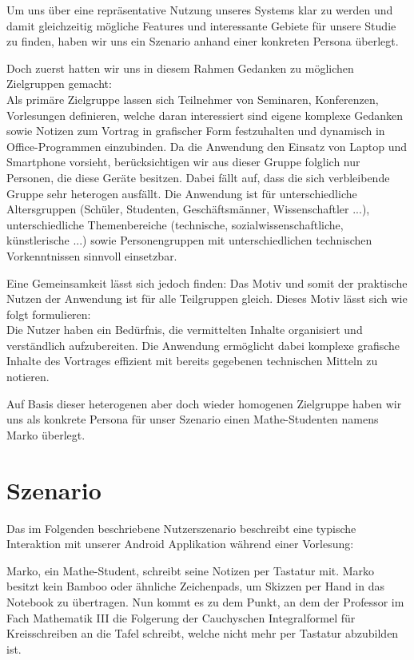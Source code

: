 \documentclass{chi-ext}
\begin{document}
Um uns über eine repräsentative Nutzung unseres Systems klar zu werden und damit gleichzeitig mögliche Features und interessante Gebiete für unsere Studie zu finden, haben wir uns ein Szenario anhand einer konkreten Persona überlegt. 

Doch zuerst hatten wir uns in diesem Rahmen Gedanken zu möglichen Zielgruppen gemacht: \\
Als primäre Zielgruppe lassen sich Teilnehmer von Seminaren, Konferenzen, Vorlesungen definieren, welche daran interessiert sind eigene komplexe Gedanken sowie Notizen zum Vortrag in grafischer Form festzuhalten und dynamisch in Office-Programmen einzubinden.
Da die Anwendung den Einsatz von Laptop und Smartphone vorsieht, berücksichtigen wir aus dieser Gruppe folglich nur Personen, die diese Geräte besitzen.
Dabei fällt auf, dass die sich verbleibende Gruppe sehr heterogen ausfällt. Die Anwendung ist für unterschiedliche Altersgruppen (Schüler, Studenten, Geschäftsmänner, Wissenschaftler ...), unterschiedliche Themenbereiche (technische, sozialwissenschaftliche, künstlerische ...) sowie Personengruppen mit unterschiedlichen technischen Vorkenntnissen sinnvoll einsetzbar.

Eine Gemeinsamkeit lässt sich jedoch finden: Das Motiv und somit der praktische Nutzen der Anwendung ist für alle Teilgruppen gleich.
Dieses Motiv lässt sich wie folgt formulieren:\\
Die Nutzer haben ein Bedürfnis, die vermittelten Inhalte organisiert und verständlich aufzubereiten. Die Anwendung ermöglicht dabei komplexe grafische Inhalte des Vortrages effizient mit bereits gegebenen technischen Mitteln zu notieren.

Auf Basis dieser heterogenen aber doch wieder homogenen Zielgruppe haben wir uns als konkrete Persona für unser Szenario einen Mathe-Studenten namens Marko überlegt.


\section{Szenario}
Das im Folgenden beschriebene Nutzerszenario beschreibt eine typische Interaktion mit unserer Android Applikation während einer Vorlesung:


Marko, ein Mathe-Student, schreibt seine Notizen per Tastatur mit. Marko besitzt kein Bamboo oder ähnliche Zeichenpads, um Skizzen per Hand in das Notebook zu übertragen. Nun kommt es zu dem Punkt, an dem der Professor im Fach Mathematik III die Folgerung der Cauchyschen Integralformel für Kreisschreiben an die Tafel schreibt, welche nicht mehr per Tastatur abzubilden ist.
\end{document}
